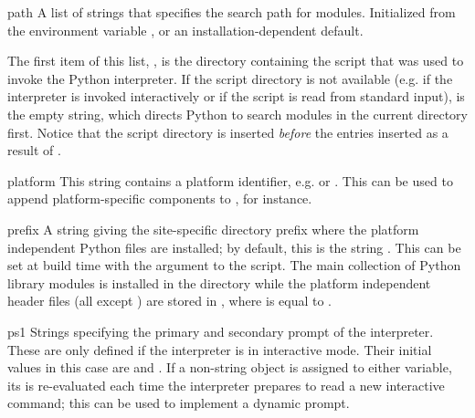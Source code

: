 \begin{datadesc}{path}
  A list of strings that specifies the search path for modules.
  Initialized from the environment variable , or an
  installation-dependent default.  

The first item of this list, , is the 
directory containing the script that was used to invoke the Python 
interpreter.  If the script directory is not available (e.g.  if the 
interpreter is invoked interactively or if the script is read from 
standard input),  is the empty string, which directs 
Python to search modules in the current directory first.  Notice that 
the script directory is inserted \emph{before} the entries inserted as 
a result of .  
\end{datadesc}

\begin{datadesc}{platform}
This string contains a platform identifier, e.g.  or
.  This can be used to append platform-specific
components to , for instance. 
\end{datadesc}

\begin{datadesc}{prefix}
A string giving the site-specific directory prefix where the platform
independent Python files are installed; by default, this is the string
.  This can be set at build time with the
 argument to the
 script.  The main collection of Python library
modules is installed in the directory  while the platform independent header
files (all except ) are stored in , where  is equal to
.
\end{datadesc}

\begin{datadesc}{ps1}
  Strings specifying the primary and secondary prompt of the
  interpreter.  These are only defined if the interpreter is in
  interactive mode.  Their initial values in this case are
   and .  If a non-string object is assigned
  to either variable, its  is re-evaluated each time
  the interpreter prepares to read a new interactive command; this can
  be used to implement a dynamic prompt.
\end{datadesc}

